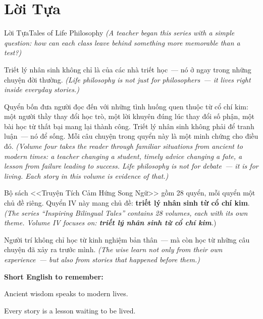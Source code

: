 \chapter*{Lời Tựa}

\begin{truyen}{Lời Tựa}{Tales of Life Philosophy}
\textit{(A teacher began this series with a simple question: how can each class leave behind something more memorable than a test?)}

Triết lý nhân sinh không chỉ là của các nhà triết học~--- nó ở ngay trong những chuyện đời thường.
\textit{(Life philosophy is not just for philosophers~--- it lives right inside everyday stories.)}

Quyển bốn đưa người đọc đến với những tình huống quen thuộc từ cổ chí kim: một người thầy thay đổi học trò, một lời khuyên đúng lúc thay đổi số phận, một bài học từ thất bại mang lại thành công. Triết lý nhân sinh không phải để tranh luận~--- nó để sống. Mỗi câu chuyện trong quyển này là một minh chứng cho điều đó.
\textit{(Volume four takes the reader through familiar situations from ancient to modern times: a teacher changing a student, timely advice changing a fate, a lesson from failure leading to success. Life philosophy is not for debate~--- it is for living. Each story in this volume is evidence of that.)}

Bộ sách <<Truyện Tích Cảm Hứng Song Ngữ>> gồm 28 quyển, mỗi quyển một chủ đề riêng. Quyển IV này mang chủ đề: \textbf{triết lý nhân sinh từ cổ chí kim}.
\textit{(The series ``Inspiring Bilingual Tales'' contains 28 volumes, each with its own theme. Volume IV focuses on: \textbf{triết lý nhân sinh từ cổ chí kim}.})
\end{truyen}

\begin{baihoc}
Người trí không chỉ học từ kinh nghiệm bản thân~--- mà còn học từ những câu chuyện đã xảy ra trước mình.
\textit{(The wise learn not only from their own experience~--- but also from stories that happened before them.)}
\end{baihoc}

\begin{tcolorbox}[
  colback=truyenblue!6, colframe=truyenblue,
  coltitle=white, fonttitle=\bfseries,
  title={Easy English},
  arc=4pt, boxrule=1pt, breakable, enhanced
]
\textbf{Short English to remember:}

Ancient wisdom speaks to modern lives.

Every story is a lesson waiting to be lived.
\end{tcolorbox}

